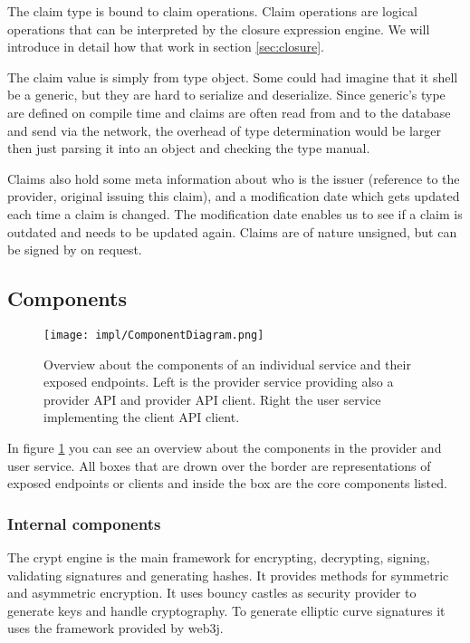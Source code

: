 The claim type is bound to claim operations. Claim operations are logical operations that can be interpreted by the closure expression engine. We will introduce in detail how that work in section \ref{sec:closure}. 

The claim value is simply from type object. Some could had imagine that it shell be a generic, but they are hard to serialize and deserialize. Since generic’s type are defined on compile time and claims are often read from and to the database and send via the network, the overhead of type determination would be larger then just parsing it into an object and checking the type manual. 

Claims also hold some meta information about who is the issuer (reference to the provider, original issuing this claim), and a modification date which gets updated each time a claim is changed. The modification date enables us to see if a claim is outdated and needs to be updated again. Claims are of nature unsigned, but can be signed by on request. 

\subsection{Components}
\begin{figure}
\texttt{[image: impl/ComponentDiagram.png]}
\centering
\caption{Overview about the components of an individual service and their exposed endpoints. Left is the provider service providing also a provider API and provider API client. Right the user service implementing the client API client.}
\label{fig:componentDiagram}
\end{figure}

In figure \ref{fig:componentDiagram} you can see an overview about the components in the provider and user service. All boxes that are drown over the border are representations of exposed endpoints or clients and inside the box are the core components listed.

\subsubsection{Internal components}
The crypt engine is the main framework for encrypting, decrypting, signing, validating signatures and generating hashes. It provides methods for symmetric and asymmetric encryption. It uses bouncy castles as security provider to generate keys and handle cryptography. To generate elliptic curve signatures it uses the framework provided by web3j. 

